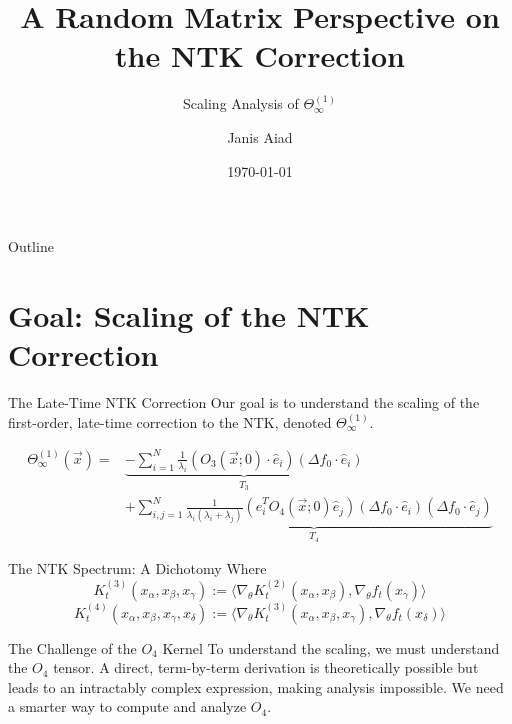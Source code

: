 \documentclass{beamer}
\title{A Random Matrix Perspective on the NTK Correction}
\subtitle{Scaling Analysis of $\Theta^{(1)}_\infty$}
\author{Janis Aiad}
\institute{UMD, Ecole Polytechnique}
\date{\today}
\begin{document}
\begin{frame}
\titlepage
\end{frame}

\begin{frame}{Outline}
\tableofcontents
\end{frame}

\section{Goal: Scaling of the NTK Correction}

\begin{frame}{The Late-Time NTK Correction}
Our goal is to understand the scaling of the first-order, late-time correction to the NTK, denoted $\Theta^{(1)}_\infty$.
\begin{theorem}
\begin{align*}
\Theta^{(1)}_\infty(\vec{x}) = & \underbrace{-\sum_{i=1}^N \frac{1}{\lambda_{i}}(O_{3}(\vec{x};0)\cdot\hat{e}_{i})(\Delta f_{0}\cdot\hat{e}_{i})}_{T_3} \\
& + \underbrace{\sum_{i,j=1}^N\frac{1}{\lambda_{i}(\lambda_{i}+\lambda_{j})}(\hat{e}_{i}^{T}O_{4}(\vec{x};0)\hat{e}_{j})(\Delta f_{0}\cdot \hat{e}_{i})(\Delta f_{0}\cdot \hat{e}_{j})}_{T_4}
\end{align*}
\end{theorem}
\vfill

\end{frame}


\begin{frame}{The NTK Spectrum: A Dichotomy}
    Where
    \begin{equation}
        K^{(3)}_t(x_\alpha, x_\beta, x_\gamma) := \langle \nabla_\theta K^{(2)}_t(x_\alpha, x_\beta), \nabla_\theta f_t(x_\gamma) \rangle
    \end{equation}
    \begin{equation}
            K^{(4)}_t(x_\alpha, x_\beta, x_\gamma, x_\delta) := \langle \nabla_\theta K^{(3)}_t(x_\alpha, x_\beta, x_\gamma), \nabla_\theta f_t(x_\delta) \rangle
    \end{equation}
\end{frame}



\begin{frame}{The Challenge of the $O_4$ Kernel}
    To understand the scaling, we must understand the $O_4$ tensor.
    \vfill
    A direct, term-by-term derivation is theoretically possible but leads to an intractably complex expression, making analysis impossible.
    \vfill
    We need a smarter way to compute and analyze $O_4$.
\end{frame}
    
\end{document}
